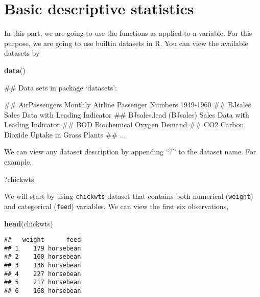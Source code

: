 \documentclass[]{book}
\newenvironment{Shaded}{\begin{snugshade}}{\end{snugshade}}
\newcommand{\KeywordTok}[1]{\textcolor[rgb]{0.13,0.29,0.53}{\textbf{#1}}}
\newcommand{\NormalTok}[1]{#1}
\theoremstyle{definition}
\theoremstyle{definition}
\theoremstyle{remark}
\begin{document}
\section{Basic descriptive
statistics}\label{basic-descriptive-statistics}

In this part, we are going to use the functions as applied to a
variable. For this purpose, we are going to use builtin datasets in R.
You can view the available datasets by

\begin{Shaded}
\begin{Highlighting}[]
\KeywordTok{data}\NormalTok{()}
\end{Highlighting}
\end{Shaded}

\begin{Shaded}
\begin{Highlighting}[]
\NormalTok{## Data sets in package ‘datasets’:}

\NormalTok{## AirPassengers                     Monthly Airline Passenger Numbers 1949-1960}
\NormalTok{## BJsales                           Sales Data with Leading Indicator}
\NormalTok{## BJsales.lead (BJsales)            Sales Data with Leading Indicator}
\NormalTok{## BOD                               Biochemical Oxygen Demand}
\NormalTok{## CO2                               Carbon Dioxide Uptake in Grass Plants}
\NormalTok{## ...}
\end{Highlighting}
\end{Shaded}

We can view any dataset description by appending ``?'' to the dataset
name. For example,

\begin{Shaded}
\begin{Highlighting}[]
\NormalTok{?chickwts}
\end{Highlighting}
\end{Shaded}

We will start by using \texttt{chickwts} dataset that contains both
numerical (\texttt{weight}) and categorical (\texttt{feed}) variables.
We can view the first six observations,

\begin{Shaded}
\begin{Highlighting}[]
\KeywordTok{head}\NormalTok{(chickwts)}
\end{Highlighting}
\end{Shaded}

\begin{verbatim}
##   weight      feed
## 1    179 horsebean
## 2    160 horsebean
## 3    136 horsebean
## 4    227 horsebean
## 5    217 horsebean
## 6    168 horsebean
\end{verbatim}
\end{document}
